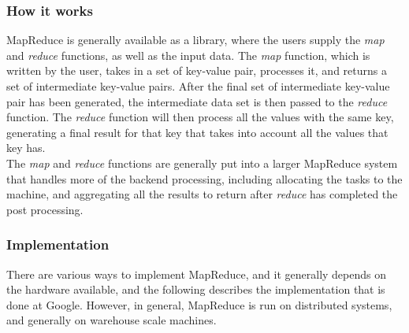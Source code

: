 \documentclass[]{article}
\begin{document}
\subsubsection{How it works}
MapReduce is generally available as a library, where the users supply the \emph{map} and \emph{reduce} functions, as well as the input data. The \emph{map} function, which is written by the user, takes in a set of key-value pair, processes it, and returns a set of intermediate key-value pairs. After the final set of intermediate key-value pair has been generated, the intermediate data set is then passed to the \emph{reduce} function. The \emph{reduce} function will then process all the values with the same key, generating a final result for that key that takes into account all the values that key has.\\

The \emph{map} and \emph{reduce} functions are generally put into a larger MapReduce system that handles more of the backend processing, including allocating the tasks to the machine, and aggregating all the results to return after \emph{reduce} has completed the post processing.\\


\subsubsection{Implementation}
There are various ways to implement MapReduce, and it generally depends on the hardware available, and the following describes the implementation that is done at Google. However, in general, MapReduce is run on distributed systems, and generally on warehouse scale machines.\\
\end{document}
